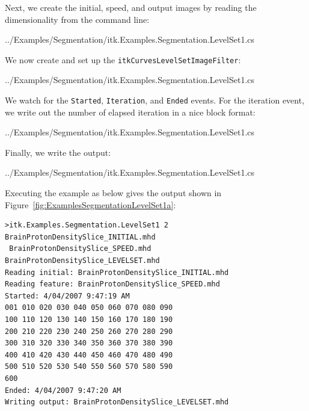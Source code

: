 \documentclass{InsightArticle}
\def\code#1{\texttt{#1}}
\begin{document}
Next, we create the initial, speed, and output images by reading the 
dimensionality from the command line:
\begin{center}
	
	{../Examples/Segmentation/itk.Examples.Segmentation.LevelSet1.cs}
\end{center}

We now create and set up the \code{itkCurvesLevelSetImageFilter}:
\begin{center}
	
	{../Examples/Segmentation/itk.Examples.Segmentation.LevelSet1.cs}
\end{center}

We watch for the \code{Started}, \code{Iteration}, and \code{Ended} events.
For the iteration event, we write out the number of elapsed iteration
in a nice block format:
\begin{center}
	
	{../Examples/Segmentation/itk.Examples.Segmentation.LevelSet1.cs}
\end{center}

Finally, we write the output:
\begin{center}
	
	{../Examples/Segmentation/itk.Examples.Segmentation.LevelSet1.cs}
\end{center}

Executing the example as below gives the output shown in Figure~\ref{fig:ExamplesSegmentationLevelSet1a}:

\begin{lstlisting}
>itk.Examples.Segmentation.LevelSet1 2 BrainProtonDensitySlice_INITIAL.mhd 
 BrainProtonDensitySlice_SPEED.mhd BrainProtonDensitySlice_LEVELSET.mhd
Reading initial: BrainProtonDensitySlice_INITIAL.mhd
Reading feature: BrainProtonDensitySlice_SPEED.mhd
Started: 4/04/2007 9:47:19 AM
001 010 020 030 040 050 060 070 080 090
100 110 120 130 140 150 160 170 180 190
200 210 220 230 240 250 260 270 280 290
300 310 320 330 340 350 360 370 380 390
400 410 420 430 440 450 460 470 480 490
500 510 520 530 540 550 560 570 580 590
600
Ended: 4/04/2007 9:47:20 AM
Writing output: BrainProtonDensitySlice_LEVELSET.mhd
\end{lstlisting}
\end{document}
